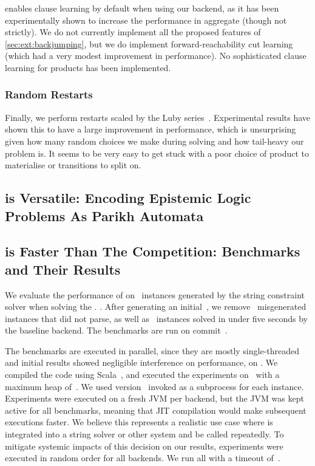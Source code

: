 \documentclass[acmsmall,review,anonymous,screen]{acmart}\settopmatter{printfolios=true,printccs=false,printacmref=true}
\theoremstyle{definition}
\newif\ifoutline
\newcommand{\contents}[1]{\ifoutline{\color{blue}
    \begin{itemize}
    #1
    \end{itemize}
  }\fi}
\begin{document}
\Catra{} enables clause learning by default when using our backend, as it has
been experimentally shown to increase the performance in aggregate (though not
strictly). We do not currently implement all the proposed features of
\cref{sec:ext:backjumping}, but we do implement forward-reachability cut
learning (which had a very modest improvement in performance). No sophisticated
clause learning for products has been implemented.

\subsubsection{Random Restarts}

Finally, we perform restarts scaled by the Luby series~\cite{luby}. Experimental
results have shown this to have a large improvement in performance, which is
unsurprising given how many random choices we make during solving and how
tail-heavy our problem is. It seems to be very easy to get stuck with a poor
choice of product to materialise or transitions to split on.

\subsection{\Catra{} is Versatile: Encoding Epistemic Logic Problems As Parikh Automata}

\contents{
\item Model-checking examples e.g. \cite{epistemic-logic}
}

\subsection{\Catra{} is Faster Than The Competition: Benchmarks and Their Results}\label{sec:experiments}

We evaluate the performance of \Catra{} on~\NrBenchmarks{} instances generated by the \Ostrich{} string constraint solver when solving the . . After generating an initial~\InitialNrBenchmarks{}, we remove~\NrBroken{} misgenerated instances that did not parse, as well as~\NrTrivial{} instances solved in under five seconds by the baseline backend. The benchmarks are run on commit~\texttt{\commit}.

The benchmarks are executed in parallel, since they are mostly single-threaded and initial results showed negligible interference on performance, on \BenchmarkRig{}. We compiled the code using Scala~\ScalaVersion{}, and executed the experiments on~\JvmVersion{} with a maximum heap of~\MaxHeapSize{}. We used \Nuxmv{} version~\NuxmvVersion{} invoked as a subprocess for each instance. Experiments were executed on a fresh JVM per backend, but the JVM was kept active for all benchmarks, meaning that JIT compilation would make subsequent executions faster. We believe this represents a realistic use case where \Calculus{} is integrated into a string solver or other system and be called repeatedly. To mitigate systemic impacts of this decision on our results, experiments were executed in random order for all backends. We run all  with a timeout of~\RuntimeTimeout{}.
\end{document}
